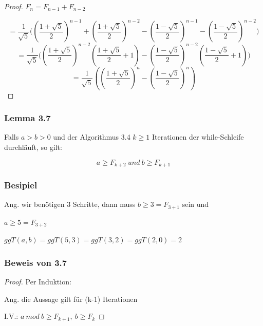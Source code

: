 \documentclass[12pt]{article}
\begin{document}
\begin{algorithm}
\begin{proof}
$F_n= F_{n-1} + F_{n-2}$

\[
= \frac{1}{\sqrt{5}} \Bigg(
\left(\frac{1+\sqrt{5}}{2}\right)^{n-1}
+
\left(\frac{1+\sqrt{5}}{2}\right)^{n-2}
-
\left(\frac{1-\sqrt{5}}{2}\right)^{n-1}
-
\left(\frac{1-\sqrt{5}}{2}\right)^{n-2}
\Bigg)
\]
\[
= \frac{1}{\sqrt{5}} \Bigg(
\left(\frac{1+\sqrt{5}}{2}\right)^{n-2}
\left(\frac{1+\sqrt{5}}{2} + 1 \right)
-
\left(\frac{1-\sqrt{5}}{2}\right)^{n-2}
\left(\frac{1-\sqrt{5}}{2} + 1 \right)
\Bigg)
\]
\[
= \frac{1}{\sqrt{5}} \left(
\left(\frac{1+\sqrt{5}}{2}\right)^n
-
\left(\frac{1-\sqrt{5}}{2}\right)^n
\right)
\]

\end{proof}


\vspace{1cm}
\subsubsection*{Lemma 3.7}
Falls $a > b > 0$ und der Algorithmus 3.4 $k \geq 1$ Iterationen der while-Schleife durchläuft, so gilt: 


\vspace{0.25cm}
$$a \geq F_{k+2} \ und \ b \geq F_{k+1}$$


\vspace{1cm}

\subsubsection*{Besipiel}
Ang. wir benötigen 3 Schritte, dann muss $b \geq 3= F_{3+1}$  sein und 

\noindent $a \geq 5= F_{3+2}$

\vspace{0.3cm}
$ggT(a,b)= ggT(5,3)= ggT(3,2)= ggT(2,0)= 2$ 

\vspace{1cm}

\subsubsection*{Beweis von 3.7}

\begin{proof}
Per Induktion: 

\vspace{=0.25cm}
\noindent Ang. die Aussage gilt für (k-1) Iterationen


\noindent I.V.: $ a \ mod \ b \geq F_{k+1}, \ b \geq F_{k}$



\vspace{0.3cm}


\end{proof}
\end{algorithm}
\end{document}
